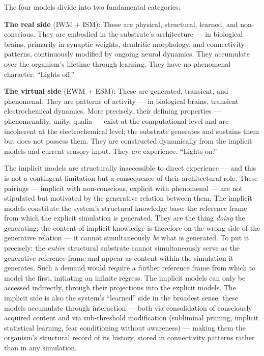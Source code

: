 \documentclass[12pt]{article}
\newcommand{\rev}[1]{#1}
\begin{document}
The four models divide into two fundamental categories:

\textbf{The real side} (IWM + ISM): These are physical, structural, learned, and non-conscious. They are \rev{embodied} in the substrate's architecture --- in biological brains, primarily in synaptic weights, dendritic morphology, and connectivity patterns, \rev{continuously modified by ongoing neural dynamics}. They accumulate over the organism's lifetime through learning. They have no phenomenal character. ``Lights off.''

\textbf{The virtual side} (EWM + ESM): These are generated, transient, and phenomenal. They are patterns of activity --- in biological brains, transient electrochemical dynamics. More precisely, their defining properties --- phenomenality, unity, qualia --- exist at the computational level and are incoherent at the electrochemical level; the substrate generates and sustains them but does not possess them. They are constructed dynamically from the implicit models and current sensory input. They \emph{are} experience. ``Lights on.''

The implicit models are structurally inaccessible to direct experience --- and this is not a contingent limitation but a consequence of their architectural role. These pairings --- implicit with non-conscious, explicit with phenomenal --- are not stipulated but motivated by the generative relation between them. The implicit models constitute the system's structural knowledge base: the reference frame from which the explicit simulation is generated. They are the thing \emph{doing} the generating; the content of implicit knowledge is therefore on the wrong side of the generative relation --- it cannot simultaneously \emph{be} what is generated. To put it precisely: the \emph{entire} structural substrate cannot simultaneously serve as the generative reference frame and appear as content within the simulation it generates. Such a demand would require a further reference frame from which to model the first, initiating an infinite regress. The implicit models can only be accessed indirectly, through their projections into the explicit models. The implicit side is also the system's ``learned'' side in the broadest sense: these models accumulate through interaction --- both via consolidation of consciously acquired content and via sub-threshold modification (subliminal priming, implicit statistical learning, fear conditioning without awareness) --- making them the organism's structural record of its history, stored in connectivity patterns rather than in any simulation.
\end{document}
